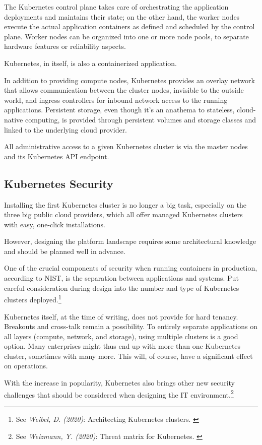 The Kubernetes control plane takes care of orchestrating the application deployments and maintains their state; on the other hand, the worker nodes execute the actual application containers as defined and scheduled by the control plane. Worker nodes can be organized into one or more node pools, to separate hardware features or reliability aspects.

Kubernetes, in itself, is also a containerized application.

In addition to providing compute nodes, Kubernetes provides an overlay network that allows communication between the cluster nodes, invisible to the outside world, and ingress controllers for inbound network access to the running applications. Persistent storage, even though it's an anathema to stateless, cloud-native computing, is provided through persistent volumes and storage classes and linked to the underlying cloud provider.

All administrative access to a given Kubernetes cluster is via the master nodes and its Kubernetes API endpoint.

\subsection{Kubernetes Security}

Installing the first Kubernetes cluster is no longer a big task, especially on the three big public cloud providers, which all offer managed Kubernetes clusters with easy, one-click installations.

However, designing the platform landscape requires some architectural knowledge and should be planned well in advance.

One of the crucial components of security when running containers in production, according to NIST, is the separation between applications and systems. Put careful consideration during design into the number and type of Kubernetes clusters deployed.\footnote{See \textit{Weibel, D. (2020)}: Architecting Kubernetes clusters. \cite{howMany}}

Kubernetes itself, at the time of writing, does not provide for hard tenancy. Breakouts and cross-talk remain a possibility. To entirely separate applications on all layers (compute, network, and storage), using multiple clusters is a good option. Many enterprises might thus end up with more than one Kubernetes cluster, sometimes with many more. This will, of course, have a significant effect on operations.

With the increase in popularity, Kubernetes also brings other new security challenges that should be considered when designing the IT environment.\footnote{See \textit{Weizmann, Y. (2020)}: Threat matrix for Kubernetes. \cite{threatMatrix}}

